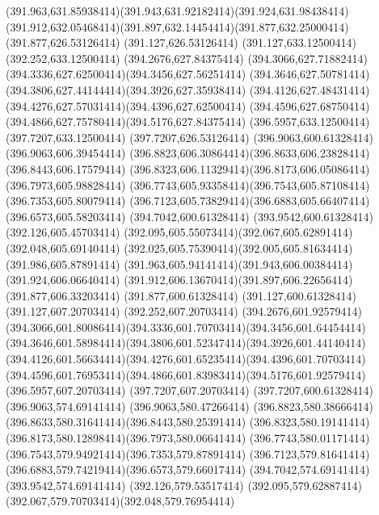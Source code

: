 {{	\curveto(391.963,631.85938414)(391.943,631.92182414)(391.924,631.98438414)
	\curveto(391.912,632.05468414)(391.897,632.14454414)(391.877,632.25000414)
	\lineto(391.877,626.53126414)
	\lineto(391.127,626.53126414)
	\lineto(391.127,633.12500414)
	\lineto(392.252,633.12500414)
	\lineto(394.2676,627.84375414)
	\curveto(394.3066,627.71882414)(394.3336,627.62500414)(394.3456,627.56251414)
	\curveto(394.3646,627.50781414)(394.3806,627.44144414)(394.3926,627.35938414)
	\curveto(394.4126,627.48431414)(394.4276,627.57031414)(394.4396,627.62500414)
	\curveto(394.4596,627.68750414)(394.4866,627.75780414)(394.5176,627.84375414)
	\lineto(396.5957,633.12500414)
	\lineto(397.7207,633.12500414)
	\lineto(397.7207,626.53126414)
	\closepath
	\moveto(396.9063,600.61328414)
	\lineto(396.9063,606.39454414)
	\curveto(396.8823,606.30864414)(396.8633,606.23828414)(396.8443,606.17579414)
	\curveto(396.8323,606.11329414)(396.8173,606.05086414)(396.7973,605.98828414)
	\curveto(396.7743,605.93358414)(396.7543,605.87108414)(396.7353,605.80079414)
	\curveto(396.7123,605.73829414)(396.6883,605.66407414)(396.6573,605.58203414)
	\lineto(394.7042,600.61328414)
	\lineto(393.9542,600.61328414)
	\lineto(392.126,605.45703414)
	\curveto(392.095,605.55073414)(392.067,605.62891414)(392.048,605.69140414)
	\curveto(392.025,605.75390414)(392.005,605.81634414)(391.986,605.87891414)
	\curveto(391.963,605.94141414)(391.943,606.00384414)(391.924,606.06640414)
	\curveto(391.912,606.13670414)(391.897,606.22656414)(391.877,606.33203414)
	\lineto(391.877,600.61328414)
	\lineto(391.127,600.61328414)
	\lineto(391.127,607.20703414)
	\lineto(392.252,607.20703414)
	\lineto(394.2676,601.92579414)
	\curveto(394.3066,601.80086414)(394.3336,601.70703414)(394.3456,601.64454414)
	\curveto(394.3646,601.58984414)(394.3806,601.52347414)(394.3926,601.44140414)
	\curveto(394.4126,601.56634414)(394.4276,601.65235414)(394.4396,601.70703414)
	\curveto(394.4596,601.76953414)(394.4866,601.83983414)(394.5176,601.92579414)
	\lineto(396.5957,607.20703414)
	\lineto(397.7207,607.20703414)
	\lineto(397.7207,600.61328414)
	\closepath
	\moveto(396.9063,574.69141414)
	\lineto(396.9063,580.47266414)
	\curveto(396.8823,580.38666414)(396.8633,580.31641414)(396.8443,580.25391414)
	\curveto(396.8323,580.19141414)(396.8173,580.12898414)(396.7973,580.06641414)
	\curveto(396.7743,580.01171414)(396.7543,579.94921414)(396.7353,579.87891414)
	\curveto(396.7123,579.81641414)(396.6883,579.74219414)(396.6573,579.66017414)
	\lineto(394.7042,574.69141414)
	\lineto(393.9542,574.69141414)
	\lineto(392.126,579.53517414)
	\curveto(392.095,579.62887414)(392.067,579.70703414)(392.048,579.76954414)
}}
